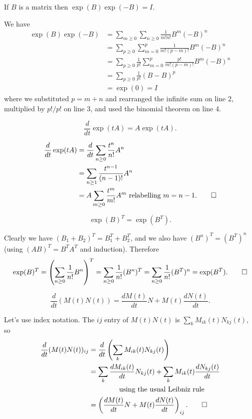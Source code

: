 \documentclass{article}
\begin{document}
\begin{Lemma}
If \(B\) is a matrix then \(\exp(B)\exp(-B)=I\).
\end{Lemma}
\begin{Proof}
We have
\begin{align*}
\exp(B)\exp(-B)&=\sum_{m\geq 0}\sum_{n\geq 0}\frac{1}{m!n!}B^m(-B)^n\\
&=\sum_{p\geq 0}\sum_{m=0}^p\frac{1}{m!(p-m)!}B^m(-B)^n\\
&=\sum_{p\geq 0}\frac{1}{p!}\sum_{m=0}^p\frac{p!}{m!(p-m)!}B^m(-B)^n\\
&=\sum_{p\geq 0}\frac{1}{p!}(B-B)^p\\
&=\exp(0)=I
\end{align*}
where we substituted \(p=m+n\) and rearranged the infinite sum on
line 2, multiplied by \(p!/p!\) on line 3, and used the binomial
theorem on line 4. \qedhere


\end{Proof}
\begin{Lemma}
\[\frac{d}{dt}\exp(tA)=A\exp(tA).\]
\end{Lemma}
\begin{Proof}
\begin{align*}
\frac{d}{dt}\exp(tA)&=\frac{d}{dt}\sum_{n\geq 0}\frac{t^n}{n!}A^n\\
&=\sum_{n\geq 1}\frac{t^{n-1}}{(n-1)!}A^n\\
&=A\sum_{m\geq 0}\frac{t^m}{m!}A^m\mbox{ relabelling }m=n-1. \qedhere
\end{align*}


\end{Proof}
\begin{Lemma}
\[\exp(B)^T=\exp(B^T).\]
\end{Lemma}
\begin{Proof}
Clearly we have \((B_1+B_2)^T=B_1^T+B_2^T\), and we also have
\((B^n)^T=(B^T)^n\) (using \((AB)^T=B^TA^T\) and
induction). Therefore
\[\exp(B)^T=\left(\sum_{n\geq 0}\frac{1}{n!}B^n\right)^T=\sum_{n\geq 0}\frac{1}{n!}(B^n)^T=\sum_{n\geq 0}\frac{1}{n!}(B^T)^n=\exp(B^T). \qedhere\]


\end{Proof}
\begin{Lemma}
\[\frac{d}{dt}(M(t)N(t))=\frac{dM(t)}{dt}N+M(t)\frac{dN(t)}{dt}.\]
\end{Lemma}
\begin{Proof}
Let's use index notation. The \(ij\) entry of \(M(t)N(t)\) is
\(\sum_kM_{ik}(t)N_{kj}(t)\), so
\begin{align*}
\frac{d}{dt}(M(t)N(t))_{ij}&=\frac{d}{dt}\left(\sum_kM_{ik}(t)N_{kj}(t)\right)\\
&=\sum_k\frac{dM_{ik}(t)}{dt}N_{kj}(t)+\sum_kM_{ik}(t)\frac{dN_{kj}(t)}{dt}\\
&\qquad\qquad\mbox{ using the usual Leibniz rule}\\
&=\left(\frac{dM(t)}{dt}N+M(t)\frac{dN(t)}{dt}\right)_{ij}. \qedhere
\end{align*}


\end{Proof}
\end{document}
